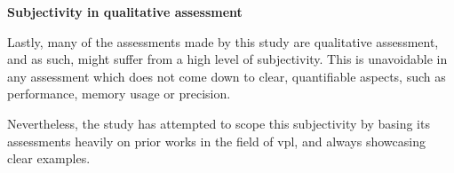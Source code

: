 




\textbf{Subjectivity in qualitative assessment}

Lastly, many of the assessments made by this study are qualitative assessment, and as such, might suffer from a high level of subjectivity. 
This is unavoidable in any assessment which does not come down to clear, quantifiable aspects, such as performance, memory usage or precision. 

Nevertheless, the study has attempted to scope this subjectivity by basing its assessments heavily on prior works in the field of vpl, and always showcasing clear examples. 



